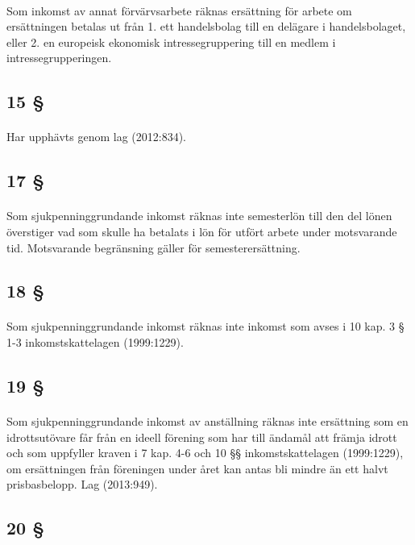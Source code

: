 \documentclass[a4paper,notitlepage,openany,10pt]{book}
\begin{document}
\paragraph*{}
Som inkomst av annat förvärvsarbete räknas ersättning för arbete om ersättningen betalas ut från 1. ett handelsbolag till en delägare i handelsbolaget, eller 2. en europeisk ekonomisk intressegruppering till en medlem i intressegrupperingen.
\subsection*{15 §}
\paragraph*{}
Har upphävts genom
lag (2012:834).
\subsection*{17 §}
\paragraph*{}
Som sjukpenninggrundande inkomst räknas inte semesterlön till den del lönen överstiger vad som skulle ha betalats i lön för utfört arbete under motsvarande tid. Motsvarande begränsning gäller för semesterersättning.
\subsection*{18 §}
\paragraph*{}
Som sjukpenninggrundande inkomst räknas inte inkomst som avses i 10 kap. 3 § 1-3 inkomstskattelagen (1999:1229).
\subsection*{19 §}
\paragraph*{}
Som sjukpenninggrundande inkomst av anställning räknas inte ersättning som en idrottsutövare får från en ideell förening som har till ändamål att främja idrott och som uppfyller kraven i 7 kap. 4-6 och 10 §§ inkomstskattelagen (1999:1229), om ersättningen från föreningen under året kan antas bli mindre än ett halvt prisbasbelopp.
Lag (2013:949).
\subsection*{20 §}
\end{document}
